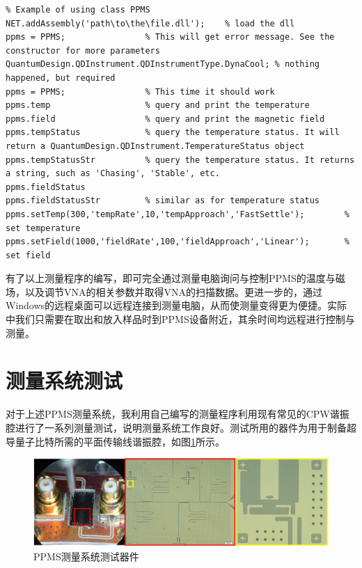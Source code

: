             \begin{lstlisting}
% Example of using class PPMS
NET.addAssembly('path\to\the\file.dll');	% load the dll
ppms = PPMS;				% This will get error message. See the constructor for more parameters
QuantumDesign.QDInstrument.QDInstrumentType.DynaCool; % nothing happened, but required
ppms = PPMS;				% This time it should work
ppms.temp					% query and print the temperature
ppms.field					% query and print the magnetic field
ppms.tempStatus				% query the temperature status. It will return a QuantumDesign.QDInstrument.TemperatureStatus object
ppms.tempStatusStr			% query the temperature status. It returns a string, such as 'Chasing', 'Stable', etc.
ppms.fieldStatus
ppms.fieldStatusStr			% similar as for temperature status
ppms.setTemp(300,'tempRate',10,'tempApproach','FastSettle');		% set temperature
ppms.setField(1000,'fieldRate',100,'fieldApproach','Linear');		% set field
            \end{lstlisting}

            有了以上测量程序的编写，即可完全通过测量电脑询问与控制PPMS的温度与磁场，以及调节VNA的相关参数并取得VNA的扫描数据。更进一步的，通过Windows的远程桌面可以远程连接到测量电脑，从而使测量变得更为便捷。实际中我们只需要在取出和放入样品时到PPMS设备附近，其余时间均远程进行控制与测量。







            \section{测量系统测试} %
            \label{sec:测量系统测试}
                  对于上述PPMS测量系统，我利用自己编写的测量程序利用现有常见的CPW谐振腔进行了一系列测量测试，说明测量系统工作良好。测试所用的器件为用于制备超导量子比特所需的平面传输线谐振腔，如图\ref{fig:PPMSSetupTestChip}所示。


            \begin{figure}[h]
                \centering
                \includegraphics[width=\textwidth]{figures/PPMSTestChip.png}
                \caption{PPMS测量系统测试器件}
                \label{fig:PPMSSetupTestChip}
            \end{figure}

